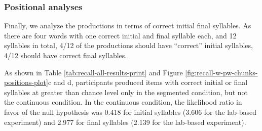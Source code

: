 \documentclass[
]{article}
\begin{document}
\subsubsection{Positional analyses}\label{positional-analyses}

Finally, we analyze the productions in terms of correct initial final
syllables. As there are four words with one correct initial and final
syllable each, and 12 syllables in total, 4/12 of the productions should
have ``correct'' initial syllables, 4/12 should have correct final
syllables.

As shown in Table \ref{tab:recall-all-results-print} and Figure
\ref{fig:recall-w-pw-chunks-positions-plot}c and d, participants
produced items with correct initial or final syllables at greater than
chance level only in the segmented condition, but not the continuous
condition. In the continuous condition, the likelihood ratio in favor of
the null hypothesis was 0.418 for initial syllables (3.606 for the
lab-based experiment) and 2.977 for final syllables (2.139 for the
lab-based experiment).
\end{document}
